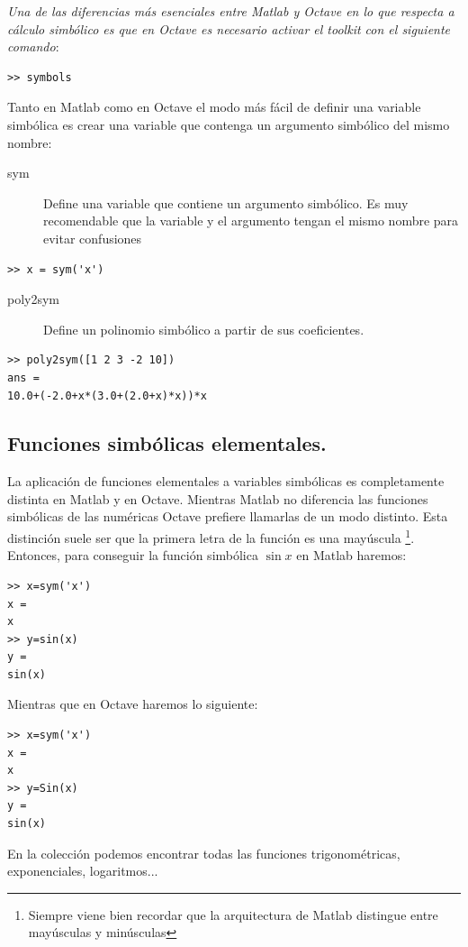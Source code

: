 \emph{Una de las diferencias más esenciales entre Matlab y Octave en
  lo que respecta a cálculo simbólico es que en Octave es necesario
  activar el toolkit con el siguiente comando}:

\begin{verbatim}
>> symbols
\end{verbatim}
Tanto en Matlab como en Octave el modo más fácil de definir una
variable simbólica es crear una variable que contenga un argumento
simbólico del mismo nombre:

\begin{description}
\item [sym]Define una variable que contiene un argumento
  simbólico.  Es muy recomendable que la variable y el argumento
  tengan el mismo nombre para evitar confusiones
\end{description}
\begin{verbatim}
>> x = sym('x')
\end{verbatim}
\begin{description}
\item [poly2sym]Define un polinomio simbólico a partir
  de sus coeficientes.
\end{description}
\begin{verbatim}
>> poly2sym([1 2 3 -2 10])
ans =
10.0+(-2.0+x*(3.0+(2.0+x)*x))*x
\end{verbatim}

\subsection{Funciones simbólicas elementales.}

La aplicación de funciones elementales a variables simbólicas es completamente
distinta en Matlab y en Octave. Mientras Matlab no diferencia las
funciones simbólicas de las numéricas Octave prefiere llamarlas de
un modo distinto. Esta distinción suele ser que la primera letra de
la función es una mayúscula%
\footnote{Siempre viene bien recordar que la arquitectura de Matlab distingue
entre mayúsculas y minúsculas%
}. Entonces, para conseguir la función simbólica $\sin x$ en Matlab
haremos:

  \begin{verbatim}
>> x=sym('x')
x =
x
>> y=sin(x)
y =
sin(x)
 \end{verbatim}
Mientras que en Octave haremos lo siguiente:

  \begin{verbatim}
>> x=sym('x')
x =
x
>> y=Sin(x)
y =
sin(x)
 \end{verbatim}
En la colección podemos encontrar todas las funciones trigonométricas,
exponenciales, logaritmos...


